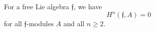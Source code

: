 For a free Lie algebra $\mathfrak{f}$, we have
$$H^n(\mathfrak{f}, A) = 0$$
for all $\mathfrak{f}$-modules $A$ and all $n \geq 2$.
